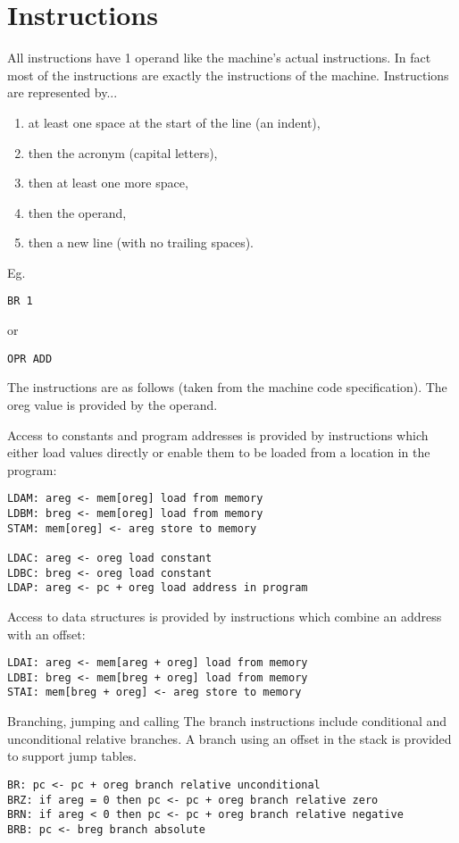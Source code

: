 \documentclass[10pt,a4paper]{article}
\begin{document}
\section{Instructions}

All instructions have 1 operand like the machine's actual instructions. In fact most of the instructions are exactly the instructions of the machine. Instructions are represented by...
\begin{enumerate}
\item at least one space at the start of the line (an indent),
\item then the acronym (capital letters),
\item then at least one more space,
\item then the operand,
\item then a new line (with no trailing spaces).
\end{enumerate}

\noindent Eg.
\begin{lstlisting}[frame=single]
  BR 1
\end{lstlisting}
or
\begin{lstlisting}[frame=single]
  OPR ADD
\end{lstlisting}

\newpage

\noindent The instructions are as follows (taken from the machine code specification). The oreg value is provided by the operand.
\break

Access to constants and program addresses is provided by instructions which either
load values directly or enable them to be loaded from a location in the program:
\begin{verbatim}
LDAM: areg <- mem[oreg] load from memory
LDBM: breg <- mem[oreg] load from memory
STAM: mem[oreg] <- areg store to memory

LDAC: areg <- oreg load constant
LDBC: breg <- oreg load constant
LDAP: areg <- pc + oreg load address in program
\end{verbatim}

Access to data structures is provided by instructions which combine an address
with an offset:
\begin{verbatim}
LDAI: areg <- mem[areg + oreg] load from memory
LDBI: breg <- mem[breg + oreg] load from memory
STAI: mem[breg + oreg] <- areg store to memory
\end{verbatim}

Branching, jumping and calling
The branch instructions include conditional and unconditional relative branches.
A branch using an offset in the stack is provided to support jump tables.
\begin{verbatim}
BR: pc <- pc + oreg branch relative unconditional
BRZ: if areg = 0 then pc <- pc + oreg branch relative zero
BRN: if areg < 0 then pc <- pc + oreg branch relative negative
BRB: pc <- breg branch absolute
\end{verbatim}
\end{document}
